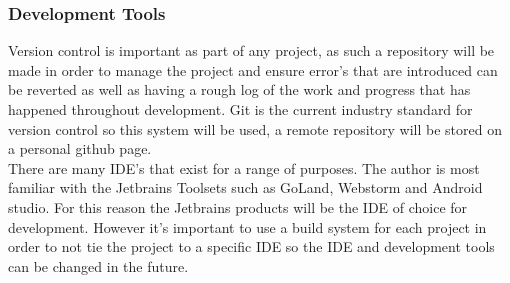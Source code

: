 \subsubsection{Development Tools}
Version control is important as part of any project, as such a repository will be made in order to manage the project and ensure error's that are introduced can be reverted as well as having a rough log of the work and progress that has happened throughout development. Git is the current industry standard for version control so this system will be used, a remote repository will be stored on a personal github page.\\

There are many IDE's that exist for a range of purposes. The author is most familiar with the Jetbrains Toolsets such as GoLand, Webstorm and Android studio. For this reason the Jetbrains products will be the IDE of choice for development. However it's important to use a build system for each project in order to not tie the project to a specific IDE so the IDE and development tools can be changed in the future.



